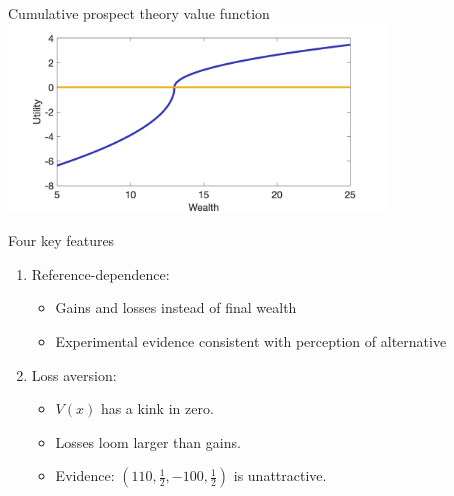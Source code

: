 \begin{frame}{Cumulative prospect theory value function}
\centering
\includegraphics[width= 0.75\textwidth]{cpt_utility}
\end{frame}


\begin{frame}{Four key features}
    \begin{enumerate}[1.]
        \item Reference-dependence:\bigskip
            \begin{itemize}
                \item Gains and losses instead of final wealth\medskip
                \item Experimental evidence consistent with perception of alternative\medskip
            \end{itemize}\bigskip
        \item Loss aversion:\bigskip
            \begin{itemize}
                \item $V(x)$ has a kink in zero.\medskip
                \item Losses loom larger than gains.\medskip
                \item Evidence: $(110,\frac{1}{2},-100,\frac{1}{2})$ is unattractive.
            \end{itemize}
    \end{enumerate}
\end{frame}

